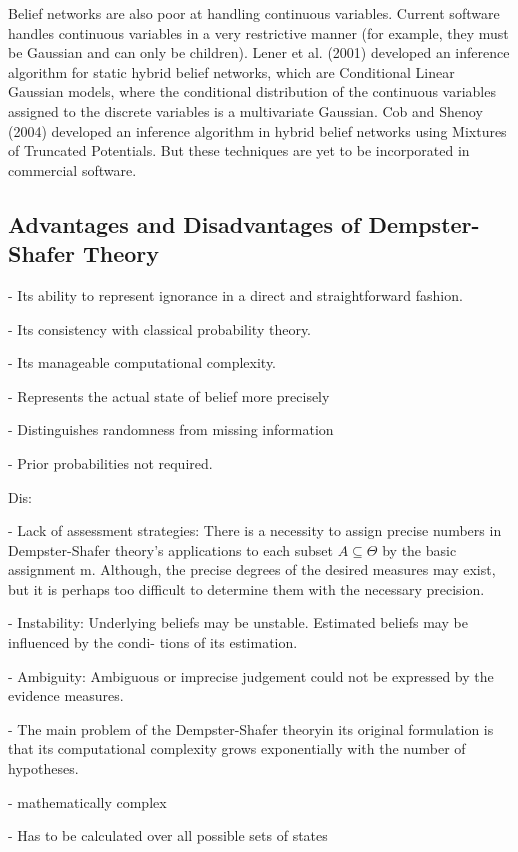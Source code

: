 \documentclass[11pt]{article}
\begin{document}
Belief networks are also poor at handling continuous variables. Current
software handles continuous variables in a very restrictive manner (for example,
they must be Gaussian and can only be children). Lener et al. (2001) developed
an inference algorithm for static hybrid belief networks, which are Conditional
Linear Gaussian models, where the conditional distribution of the continuous
variables assigned to the discrete variables is a multivariate Gaussian. Cob and
Shenoy (2004) developed an inference algorithm in hybrid belief networks using
Mixtures of Truncated Potentials. But these techniques are yet to be incorporated
in commercial software.

\subsection{Advantages and Disadvantages of Dempster-Shafer Theory}

- Its ability to represent ignorance in a direct and straightforward fashion.

- Its consistency with classical probability theory.

- Its manageable computational complexity.

- Represents the actual state of belief more precisely

- Distinguishes randomness from missing information

- Prior probabilities not required.

Dis:

- Lack of assessment strategies: There is a necessity to assign precise numbers
in Dempster-Shafer theory's applications to each subset $A \subseteq \Theta$ by
the basic assignment m. Although, the precise degrees of the desired measures
may exist, but it is perhaps too difficult to determine them with the necessary
precision.

- Instability: Underlying beliefs may be unstable. Estimated beliefs may be
influenced by the condi- tions of its estimation.

- Ambiguity: Ambiguous or imprecise judgement could not be expressed by the
evidence measures.

- The main problem of the Dempster-Shafer theoryin its original formulation is
that its computational complexity grows exponentially with the number of
hypotheses.

- mathematically complex

- Has to be calculated over all possible sets of states
\end{document}
